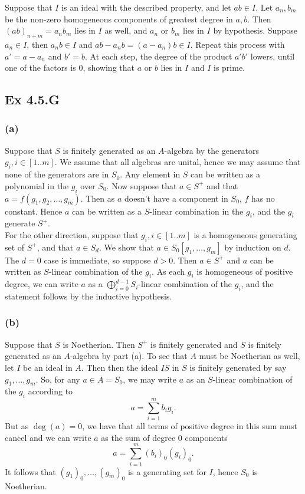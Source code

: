 \documentclass{article}
\theoremstyle{definition}
\begin{document}
Suppose that $I$ is an ideal with the described property, and let $ab \in I$.
Let $a_n, b_m$ be the non-zero homogeneous components of greatest degree in $a,
	b$. Then $(ab)_{n + m} = a_nb_m$ lies in $I$ as well, and $a_n$ or $b_m$ lies
in $I$ by hypothesis. Suppose $a_n \in I$, then $a_nb \in I$ and  $ab - a_nb =
	(a - a_n)b \in I$. Repeat this process with $a' = a - a_n$ and $b' = b$. At
each step, the degree of the product $a'b'$ lowers, until one of the factors is
$0$, showing that $a$ or $b$ lies in $I$ and $I$ is prime.


\subsection*{Ex 4.5.G}
\subsubsection*{(a)}

Suppose that $S$ is finitely generated as an $A$-algebra by the generators
$g_i, i \in [1..m]$. We assume that all algebras are unital, hence we may
assume that none of the generators are in $S_0$. Any element in $S$ can be
written as a polynomial in the $g_i$ over $S_0$. Now suppose that $a \in S^+$ and that $a
	= f(g_1, g_2, \ldots, g_m)$. Then as $a$ doesn't have a component in $S_0$, $f$
has no constant. Hence $a$ can be written as a $S$-linear combination in
the $g_i$, and the $g_i$ generate $S^{+}$. \\

For the other direction, suppose that $g_i, i \in [1..m]$ is a homogeneous
generating set of $S^{+}$, and that $a \in S_d$. We show that $a \in
	S_{0}[g_{1}, \ldots, g_m]$ by induction on $d$. The $d = 0$ case is immediate,
so suppose $d > 0$. Then $a \in S^{+}$ and $a$ can be written as $S$-linear
combination of the $g_i$. As each $g_i$ is homogeneous of positive degree, we
can write $a$ as a $\bigoplus_{i = 0}^{d - 1} S_i$-linear combination of the
$g_i$, and the statement follows by the inductive hypothesis.

\subsubsection*{(b)}

Suppose that $S$ is Noetherian. Then $S^{+}$ is finitely generated and $S$ is
finitely generated as an $A$-algebra by part (a). To see that $A$ must be
Noetherian as well, let $I$ be an ideal in $A$. Then then the ideal $IS$ in $S$
is finitely generated by say $g_1, \ldots, g_m$. So, for any $a \in A = S_{0}$,
we may write $a$ as an $S$-linear combination of the $g_i$ according to
\[
	a = \sum_{i = 1}^{m} b_i g_i.
\]
But as $\deg(a) = 0$, we have that all terms of positive degree in this sum must
cancel and we can write $a$ as the sum of degree $0$ components
\[
	a = \sum_{i = 1}^{m} (b_i)_0 (g_i)_0.
\]
It follows that $(g_1)_0, \ldots, (g_m)_{0}$ is a generating set for $I$, hence
$S_0$ is Noetherian. \\
\end{document}
